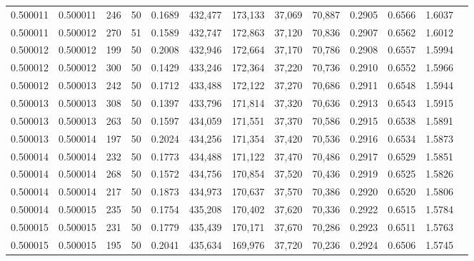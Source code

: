 \begin{tabular}{rrrrrrrrrrrrr}
0.500011 & 0.500011 &   246 &  50 &                                     0.1689 & 432,477 & 173,133 &  37,069 &  70,887 & 0.2905 & 0.6566 & 1.6037 \\
0.500011 & 0.500012 &   270 &  51 &                                     0.1589 & 432,747 & 172,863 &  37,120 &  70,836 & 0.2907 & 0.6562 & 1.6012 \\
0.500012 & 0.500012 &   199 &  50 &                                     0.2008 & 432,946 & 172,664 &  37,170 &  70,786 & 0.2908 & 0.6557 & 1.5994 \\
0.500012 & 0.500012 &   300 &  50 &                                     0.1429 & 433,246 & 172,364 &  37,220 &  70,736 & 0.2910 & 0.6552 & 1.5966 \\
0.500012 & 0.500013 &   242 &  50 &                                     0.1712 & 433,488 & 172,122 &  37,270 &  70,686 & 0.2911 & 0.6548 & 1.5944 \\
0.500013 & 0.500013 &   308 &  50 &                                     0.1397 & 433,796 & 171,814 &  37,320 &  70,636 & 0.2913 & 0.6543 & 1.5915 \\
0.500013 & 0.500013 &   263 &  50 &                                     0.1597 & 434,059 & 171,551 &  37,370 &  70,586 & 0.2915 & 0.6538 & 1.5891 \\
0.500013 & 0.500014 &   197 &  50 &                                     0.2024 & 434,256 & 171,354 &  37,420 &  70,536 & 0.2916 & 0.6534 & 1.5873 \\
0.500014 & 0.500014 &   232 &  50 &                                     0.1773 & 434,488 & 171,122 &  37,470 &  70,486 & 0.2917 & 0.6529 & 1.5851 \\
0.500014 & 0.500014 &   268 &  50 &                                     0.1572 & 434,756 & 170,854 &  37,520 &  70,436 & 0.2919 & 0.6525 & 1.5826 \\
0.500014 & 0.500014 &   217 &  50 &                                     0.1873 & 434,973 & 170,637 &  37,570 &  70,386 & 0.2920 & 0.6520 & 1.5806 \\
0.500014 & 0.500015 &   235 &  50 &                                     0.1754 & 435,208 & 170,402 &  37,620 &  70,336 & 0.2922 & 0.6515 & 1.5784 \\
0.500015 & 0.500015 &   231 &  50 &                                     0.1779 & 435,439 & 170,171 &  37,670 &  70,286 & 0.2923 & 0.6511 & 1.5763 \\
0.500015 & 0.500015 &   195 &  50 &                                     0.2041 & 435,634 & 169,976 &  37,720 &  70,236 & 0.2924 & 0.6506 & 1.5745 \\

\end{tabular}
